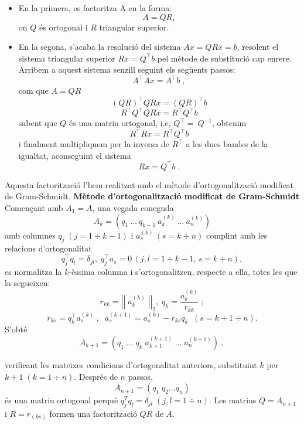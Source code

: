 \documentclass{article}
\begin{document}
\begin{itemize}
  \item En la primera, es factoritza A en la forma:
  $$ A =  QR, $$
  on $Q$ és ortogonal i $R$ triangular superior.
  \item En la segona, s'acaba la resolució del sistema $Ax = QRx = b$, resolent el sistema triangular superior $Rx = Q^\top b$ pel mètode de substitució cap enrere. Arribem a aquest sistema senzill seguint els següents passos: 
  $$A^\top Ax = A^\top b \;,$$
  com que $A = QR$
  $$\left(QR \right)^\top QRx = \left(QR \right)^\top b$$
  $$R^\top Q^\top  QRx = R^\top Q^\top  b$$
  sabent que $Q$ és una matriu ortogonal, i.e, $Q^\top =\ Q^{-1}$, obtenim
  $$R^\top Rx = R^\top Q^\top  b$$
  i finalment multipliquem per la inversa de $R^\top$ a les dues bandes de la igualtat, aconseguint el sistema
  $$Rx = Q^\top b \; .$$
\end{itemize}
Aquesta factorització l'hem realitzat amb el mètode d'ortogonalització mo\-di\-fi\-cat de Gram-Schmidt.\newline
\newline
\textbf{Mètode d'ortogonalització modificat de Gram-Schmidt}\newline
\newline
Començant amb $A_{1} = A$, una vegada coneguda
$$A_{k} = \left(q_{1}\: \ldots{}\: q_{k-1}\: a_{k}^{(k)}\: \ldots{} \:a_{n}^{(k)} \right)$$
amb columnes $q_{j}\;\left(j = 1 \div k - 1  \right)$ i $a_{s}^{(k)}\, \left(s = k \div n \right)$ complint amb les relacions d'ortogonalitat
$$q_{j}^\top q_{l} = \delta_{jl},\; q_{j}^\top a_{s} = 0\, \left(j, l = 1 \div k-1,\, s = k \div n \right),$$
es normalitza la $k$-èssima columna i s'ortogonalitzen, respecte a ella, totes les que la segueixen:
$$r_{kk} = \left| \left|\; a_{k}^{(k)}\; \right| \right|_{2}, \; q_{k} = \frac{a_{k}^{(k)}}{r_{kk}}\;; $$ 
$$r_{ks} = q_{k}^\top a_{s}^{(k)}\; , \; \; a_{s}^{(k+1)} = a_{s}^{(k)} - r_{ks}q_{k} \; \; \left( s = k+1 \div n \right) .$$
S'obté
$$A_{k+1} = \left( q_{1} \; \ldots{} \; q_{k} \; a_{k+1}^{(k+1)} \; \ldots{} \; a_{n}^{(k+1)} \right) \; ,$$

verificant les mateixes condicions d'ortogonalitat anteriors, substituint $k$ per $k+1 \; \left( k = 1 \div n \right).$ \newline
Després de $n$ passos,
$$A_{n+1} = \left(q_{1} \; q_{2} \ldots{} q_{n} \right)$$
és una matriu ortogonal perquè $q_{j}^{T}q_{l} = \delta_{jl} \; \left( j, l = 1 \div n \right).$ \newline
\newline
Les matrius $Q = A_{n+1}$ i $R = r_{(ks)}$ formen una factorització $QR$ de $A$.
\end{document}
